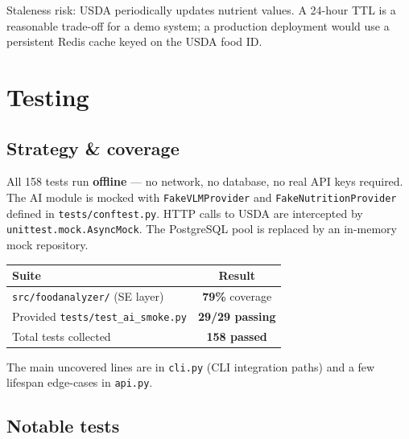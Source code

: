\documentclass[11pt,a4paper]{article}
\begin{document}
Staleness risk: USDA periodically updates nutrient values.
A 24-hour TTL is a reasonable trade-off for a demo system; a production deployment would use a persistent Redis cache keyed on the USDA food ID.

\section{Testing}\label{sec:testing}

\subsection{Strategy \& coverage}

All 158 tests run \textbf{offline} --- no network, no database, no real API keys required.
The AI module is mocked with \texttt{FakeVLMProvider} and \texttt{FakeNutritionProvider} defined in \texttt{tests/conftest.py}.
HTTP calls to USDA are intercepted by \texttt{unittest.mock.AsyncMock}.
The PostgreSQL pool is replaced by an in-memory mock repository.

\begin{center}\small
\begin{tabular}{lc}
\toprule
\textbf{Suite} & \textbf{Result} \\
\midrule
\texttt{src/foodanalyzer/} (SE layer) & \textbf{79\%} coverage \\
Provided \texttt{tests/test\_ai\_smoke.py} & \textbf{29/29 passing} \\
Total tests collected & \textbf{158 passed} \\
\bottomrule
\end{tabular}
\end{center}

The main uncovered lines are in \texttt{cli.py} (CLI integration paths) and a few lifespan edge-cases in \texttt{api.py}.

\subsection{Notable tests}
\end{document}
